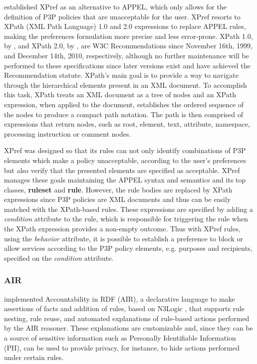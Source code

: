 \cite{agrawal_xpref_2005} established XPref as an alternative to APPEL, which only allows for the definition of P3P policies that are unacceptable for the user.
XPref resorts to XPath (XML Path Language) 1.0 and 2.0 expressions to replace APPEL rules, making the preferences formulation more precise and less error-prone.
XPath 1.0, by \cite{clark_xml_1999}, and XPath 2.0, by \cite{berglund_xml_2010}, are W3C Recommendations since November 16th, 1999, and December 14th, 2010, respectively, although no further maintenance will be performed to these specifications since later versions exist and have achieved the Recommendation statute.
XPath's main goal is to provide a way to navigate through the hierarchical elements present in an XML document.
To accomplish this task, XPath treats an XML document as a tree of nodes and an XPath expression, when applied to the document, establishes the ordered sequence of the nodes to produce a compact path notation.
The path is then comprised of expressions that return nodes, such as root, element, text, attribute, namespace, processing instruction or comment nodes.

XPref was designed so that its rules can not only identify combinations of P3P elements which make a policy unacceptable, according to the user's preferences but also verify that the presented elements are specified as acceptable.
XPref manages these goals maintaining the APPEL syntax and semantics and its top classes, \textbf{ruleset} and \textbf{rule}.
However, the rule bodies are replaced by XPath expressions since P3P policies are XML documents and thus can be easily matched with the XPath-based rules.
These expressions are specified by adding a \textit{condition} attribute to the rule, which is responsible for triggering the rule when the XPath expression provides a non-empty outcome.
Thus with XPref rules, using the \textit{behavior} attribute, it is possible to establish a preference to block or allow services according to the P3P policy elements, e.g. purposes and recipients, specified on the \textit{condition} attribute.

\subsubsection{AIR}
\label{sec:air}

\cite{hitzler_analyzing_2010} implemented Accountability in RDF (AIR), a declarative language to make assertions of facts and addition of rules, based on N3Logic \citep{berners-lee_n3logic_2008}, that supports rule nesting, rule reuse, and automated explanations of rule-based actions performed by the AIR reasoner.
These explanations are customizable and, since they can be a source of sensitive information such as Personally Identifiable Information (PII), can be used to provide privacy, for instance, to hide actions performed under certain rules.


